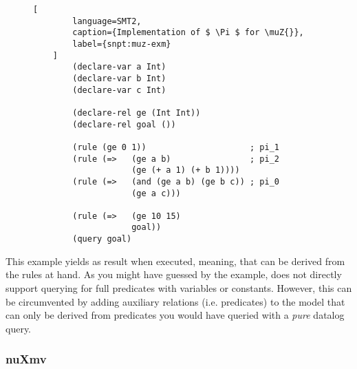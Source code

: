 \begin{figure}
    \begin{lstlisting}[
        language=SMT2,
        caption={Implementation of $ \Pi $ for \muZ{}},
        label={snpt:muz-exm}
    ]
        (declare-var a Int)
        (declare-var b Int)
        (declare-var c Int)

        (declare-rel ge (Int Int))
        (declare-rel goal ())

        (rule (ge 0 1))                     ; pi_1
        (rule (=>   (ge a b)                ; pi_2
                    (ge (+ a 1) (+ b 1))))
        (rule (=>   (and (ge a b) (ge b c)) ; pi_0
                    (ge a c)))

        (rule (=>   (ge 10 15)
                    goal))
        (query goal)
    \end{lstlisting}
\end{figure}

This example yields  as result when executed, meaning, that  can be derived from the rules at hand.
As you might have guessed by the example, \muZ{} does not directly support querying for full predicates with variables or constants.
However, this can be circumvented by adding auxiliary relations (i.e. predicates) to the model that can only be derived from predicates you would have queried with a \textit{pure} \gls{datalog} query.

\subsubsection{nuXmv}
